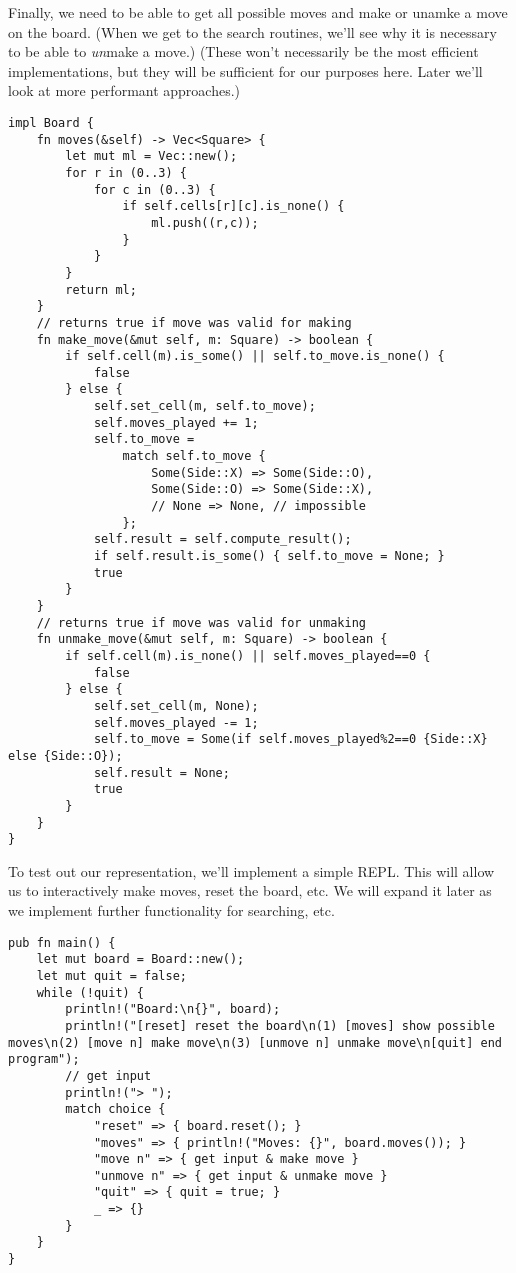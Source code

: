 \documentclass[10pt,dvipdfmx,letterpaper]{report}
\begin{document}
Finally, we need to be able to get all possible moves and make or unamke a move on the board.
(When we get to the search routines, we'll see why it is necessary to be able to {\em un}make a move.)
(These won't necessarily be the most efficient implementations, but they will be sufficient for our
purposes here.  Later we'll look at more performant approaches.)
{\scriptsize\begin{verbatim}
impl Board {
    fn moves(&self) -> Vec<Square> {
        let mut ml = Vec::new();
        for r in (0..3) {
            for c in (0..3) {
                if self.cells[r][c].is_none() {
                    ml.push((r,c));
                }
            }
        }
        return ml;
    }
    // returns true if move was valid for making
    fn make_move(&mut self, m: Square) -> boolean {
        if self.cell(m).is_some() || self.to_move.is_none() {
            false
        } else {
            self.set_cell(m, self.to_move);
            self.moves_played += 1;
            self.to_move =
                match self.to_move {
                    Some(Side::X) => Some(Side::O),
                    Some(Side::O) => Some(Side::X),
                    // None => None, // impossible
                };
            self.result = self.compute_result();
            if self.result.is_some() { self.to_move = None; }
            true
        }
    }
    // returns true if move was valid for unmaking
    fn unmake_move(&mut self, m: Square) -> boolean {
        if self.cell(m).is_none() || self.moves_played==0 {
            false
        } else {
            self.set_cell(m, None);
            self.moves_played -= 1;
            self.to_move = Some(if self.moves_played%2==0 {Side::X} else {Side::O});
            self.result = None;
            true
        }
    }
}
\end{verbatim}}


To test out our representation, we'll implement a simple REPL.
This will allow us to interactively make moves, reset the board, etc.
We will expand it later as we implement further functionality for searching, etc.

{\scriptsize\begin{verbatim}
pub fn main() {
    let mut board = Board::new();
    let mut quit = false;
    while (!quit) {
        println!("Board:\n{}", board);
        println!("[reset] reset the board\n(1) [moves] show possible moves\n(2) [move n] make move\n(3) [unmove n] unmake move\n[quit] end program");
        // get input
        println!("> ");
        match choice {
            "reset" => { board.reset(); }
            "moves" => { println!("Moves: {}", board.moves()); }
            "move n" => { get input & make move }
            "unmove n" => { get input & unmake move }
            "quit" => { quit = true; }
            _ => {}
        }
    }
}
\end{verbatim}}
\end{document}
